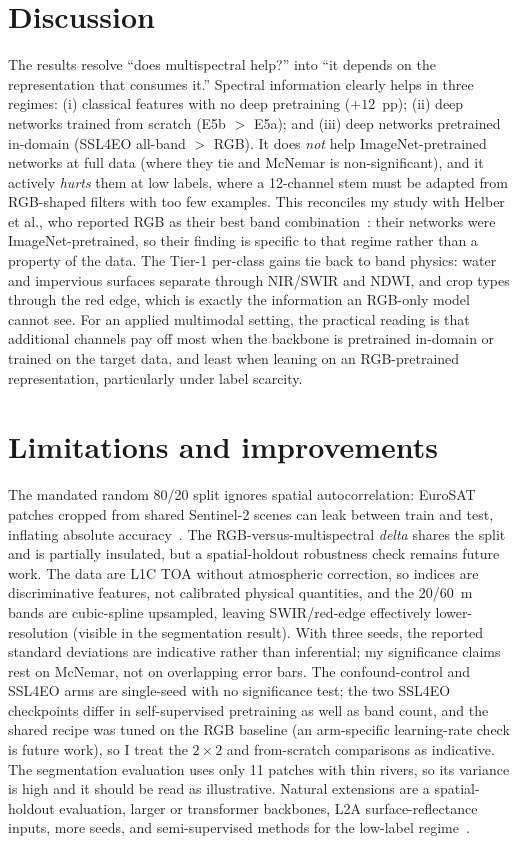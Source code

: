 \documentclass[11pt,a4paper]{article}
\begin{document}
\FloatBarrier
\section{Discussion}
The results resolve ``does multispectral help?'' into ``it depends on the
representation that consumes it.'' Spectral information clearly helps in three
regimes: (i) classical features with no deep pretraining ($+12$~pp); (ii) deep
networks trained from scratch (E5b $>$ E5a); and (iii) deep networks pretrained
in-domain (SSL4EO all-band $>$ RGB). It does \emph{not} help ImageNet-pretrained
networks at full data (where they tie and McNemar is non-significant), and it
actively \emph{hurts} them at low labels, where a 12-channel stem must be adapted
from RGB-shaped filters with too few examples. This reconciles my study with
Helber et al., who reported RGB as their best band combination~\cite{helber2019}:
their networks were ImageNet-pretrained, so their finding is specific to that
regime rather than a property of the data. The Tier-1 per-class gains tie back to
band physics: water and impervious surfaces separate through NIR/SWIR and NDWI,
and crop types through the red edge, which is exactly the information an RGB-only
model cannot see. For an applied multimodal setting, the practical reading is
that additional channels pay off most when the backbone is pretrained in-domain
or trained on the target data, and least when leaning on an RGB-pretrained
representation, particularly under label scarcity.

\section{Limitations and improvements}
The mandated random 80/20 split ignores spatial autocorrelation: EuroSAT patches
cropped from shared Sentinel-2 scenes can leak between train and test, inflating
absolute accuracy~\cite{karasiak2022}. The RGB-versus-multispectral \emph{delta}
shares the split and is partially insulated, but a spatial-holdout robustness
check remains future work. The data are L1C TOA without atmospheric correction,
so indices are discriminative features, not calibrated physical quantities, and
the 20/60~m bands are cubic-spline upsampled, leaving SWIR/red-edge effectively
lower-resolution (visible in the segmentation result). With three seeds, the
reported standard deviations are indicative rather than inferential; my
significance claims rest on McNemar, not on overlapping error bars. The
confound-control and SSL4EO arms are single-seed with no significance test; the
two SSL4EO checkpoints differ in self-supervised pretraining as well as band
count, and the shared recipe was tuned on the RGB baseline (an arm-specific
learning-rate check is future work), so I treat the $2\times2$ and from-scratch
comparisons as indicative. The segmentation evaluation uses only 11 patches with
thin rivers, so its variance is high and it should be read as illustrative.
Natural extensions are a spatial-holdout evaluation, larger or transformer
backbones, L2A surface-reflectance inputs, more seeds, and semi-supervised
methods for the low-label regime~\cite{gomez2021}.
\end{document}
